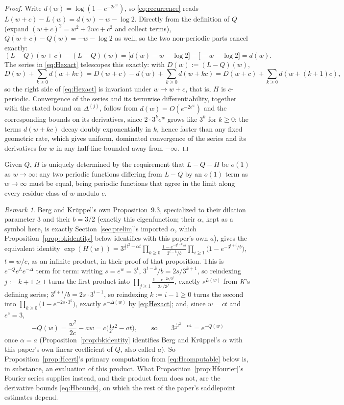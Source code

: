 \documentclass[11pt]{article}
\theoremstyle{definition}
\theoremstyle{remark}
\newtheorem{remark}[theorem]{Remark}
\begin{document}
\begin{proof}
Write $d(w) = \log(1-e^{-2e^w})$, so \eqref{eq:recurrence} reads $L(w+c)-L(w) = d(w) - w - \log 2$.
Directly from the definition of $Q$ (expand $(w+c)^2 = w^2+2wc+c^2$ and collect terms),
$Q(w+c)-Q(w) = -w-\log2$ as well, so the two non-periodic parts cancel exactly:
\[
(L-Q)(w+c) - (L-Q)(w) = \bigl[d(w)-w-\log2\bigr] - \bigl[-w-\log2\bigr] = d(w).
\]
The series in \eqref{eq:Hexact} telescopes this exactly: with $D(w) := (L-Q)(w)$,
\[
D(w) + \sum_{k\ge0} d(w+kc) = D(w+c) - d(w) + \sum_{k\ge0}d(w+kc) = D(w+c) + \sum_{k\ge0}d(w+(k+1)c),
\]
so the right side of \eqref{eq:Hexact} is invariant under $w \mapsto w+c$, that is, $H$ is
$c$-periodic. Convergence of the series and its termwise differentiability, together with the
stated bound on $\Delta^{(j)}$, follow from $d(w) = O(e^{-2e^w})$ and the corresponding bounds on
its derivatives, since $2\cdot3^k e^w$ grows like $3^k$ for $k\ge0$: the terms $d(w+kc)$ decay
doubly exponentially in $k$, hence faster than any fixed geometric rate, which gives uniform,
dominated convergence of the series and its derivatives for $w$ in any half-line bounded away from
$-\infty$.
\end{proof}

Given $Q$, $H$ is uniquely determined by the requirement that $L-Q-H$ be $o(1)$ as $w\to\infty$: any
two periodic functions differing from $L-Q$ by an $o(1)$ term as $w\to\infty$ must be equal, being
periodic functions that agree in the limit along every residue class of $w$ modulo $c$.

\begin{remark}
\label{rem:bkproduct}
Berg and Kr\"uppel's own Proposition~9.3, specialized to their dilation parameter $3$ and their
$b=3/2$ (exactly this eigenfunction; their $\alpha$, kept as a symbol here, is exactly
Section~\ref{sec:prelim}'s imported $\alpha$, which Proposition~\ref{prop:bkidentity} below
identifies with this paper's own $a$), gives
the equivalent identity $\exp(H(w)) = 3^{\frac12 t^2 - \alpha t}
\prod_{k\ge0}\frac{1-e^{-3^{t-k}/b}}{3^{t-k}/b}\prod_{i\ge1}\bigl(1-e^{-3^{t+i}/b}\bigr)$, $t=w/c$,
as an infinite product, in their proof of that proposition. This is $e^{-Q}e^Le^{-\Delta}$ term for
term: writing $s=e^w=3^t$, $3^{t-k}/b = 2s/3^{k+1}$, so reindexing $j:=k+1\ge1$ turns the first
product into $\prod_{j\ge1}\frac{1-e^{-2s/3^j}}{2s/3^j}$, exactly $e^{L(w)}$ from $K$'s defining
series; $3^{t+i}/b = 2s\cdot3^{i-1}$, so reindexing $k:=i-1\ge0$ turns the second into
$\prod_{k\ge0}\bigl(1-e^{-2s\cdot3^k}\bigr)$, exactly $e^{-\Delta(w)}$ by \eqref{eq:Hexact}; and,
since $w=ct$ and $e^c=3$,
\[
-Q(w) = \frac{w^2}{2c}-aw = c\bigl(\tfrac12t^2-at\bigr), \qquad\text{so}\qquad
3^{\frac12t^2-\alpha t} = e^{-Q(w)}
\]
once $\alpha=a$ (Proposition~\ref{prop:bkidentity} identifies
Berg and Kr\"uppel's $\alpha$ with this paper's own linear coefficient of $Q$, also called $a$).
So Proposition~\ref{prop:Hcert}'s primary computation from \eqref{eq:Hcomputable} below is, in
substance, an evaluation of this product. What Proposition~\ref{prop:Hfourier}'s Fourier series
supplies instead, and their product form does not, are the derivative bounds \eqref{eq:Hbounds},
on which the rest of the paper's saddlepoint estimates depend.
\end{remark}
\end{document}

